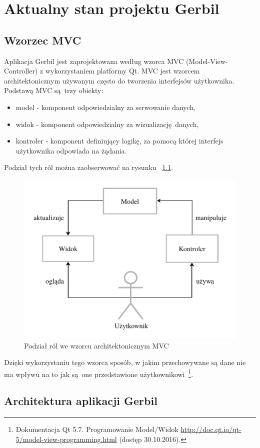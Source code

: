 \chapter{Aktualny stan projektu Gerbil}

 \section{Wzorzec MVC}

Aplikacja Gerbil jest zaprojektowana według wzorca MVC (Model-View-Controller) z wykorzystaniem platformy Qt. MVC jest wzorcem architektonicznym używanym często do tworzenia interfejsów użytkownika. Podstawą MVC są trzy obiekty:
\begin{itemize}
	\item model - komponent odpowiedzialny za serwowanie danych,
	\item widok - komponent odpowiedzialny za wizualizację danych,
	\item kontroler - komponent definiujący logikę, za pomocą której interfejs użytkownika odpowiada na żądania.
\end{itemize}
Podział tych ról można zaobserwować na rysunku ~\ref{fig:mvc}.

\begin{figure}[ht]
	\centering
	\includegraphics[width=0.7\linewidth]{rys04/mvc}
	\caption{Podział ról we wzorcu architektonicznym MVC}
	\label{fig:mvc}	
\end{figure}

Dzięki wykorzystaniu tego wzorca sposób, w jakim przechowywane są dane nie ma wpływu na to jak są one przedstawione użytkownikowi~\footnote{Dokumentacja Qt 5.7. Programowanie Model/Widok \url{http://doc.qt.io/qt-5/model-view-programming.html} (dostęp 30.10.2016).}.

\section {Architektura aplikacji Gerbil}

